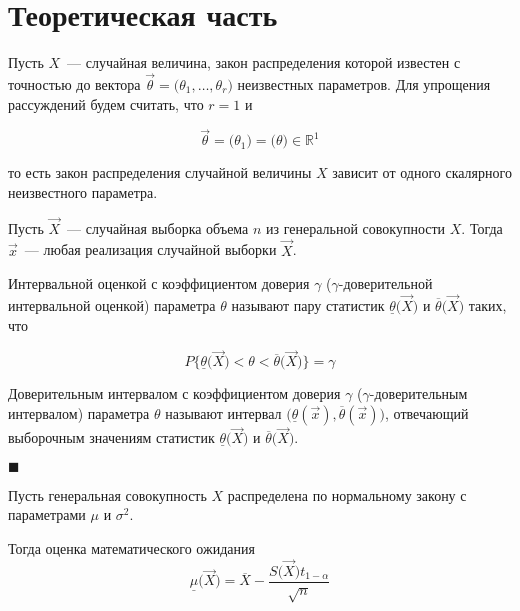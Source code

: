 \chapter{Теоретическая часть}
Пусть $X$~--- случайная величина, закон распределения которой известен с точностью до вектора $\vec \theta = \big( \theta_1, \ldots, \theta_r \big)$ неизвестных параметров. Для упрощения рассуждений будем считать, что $r = 1$ и

\begin{equation*}
    \overrightarrow \theta = \big( \theta_1 \big) = \big( \theta \big) \in \mathbb{R}^1
\end{equation*}

то есть закон распределения случайной величины $X$ зависит от одного скалярного неизвестного параметра.

Пусть $\overrightarrow X$~--- случайная выборка объема $n$ из генеральной совокупности $X$. Тогда $\vec x$~--- любая реализация случайной выборки $\overrightarrow X$.

\sloppy Интервальной оценкой с коэффициентом доверия $\gamma$ ($\gamma$-доверительной интервальной оценкой) параметра $\theta$ называют пару статистик $\underline{\theta} \big( \overrightarrow X \big)$ и $\overline{\theta} \big( \overrightarrow X \big)$ таких, что

\begin{equation*}
    P \bigg\{ \underline{\theta} \big( \overrightarrow X \big) < \theta < \overline{\theta} \big( \overrightarrow X \big) \bigg\} = \gamma
\end{equation*}

\sloppy Доверительным интервалом с коэффициентом доверия $\gamma$ ($\gamma$-доверительным интервалом) параметра $\theta$ называют интервал $\big( \underline{\theta} (\vec x),\overline{\theta} (\vec x) \big)$, отвечающий выборочным значениям статистик $\underline{\theta} \big( \overrightarrow X \big)$ и $\overline{\theta} \big( \overrightarrow X \big)$.

$\blacksquare{}$

Пусть генеральная совокупность $X$ распределена по нормальному закону с параметрами $\mu$ и $\sigma^2$.

Тогда оценка математического ожидания
\begin{equation*}
    \underline{\mu} \big( \overrightarrow X \big) = \overline X - \frac{S\big( \overrightarrow X \big) t_{1 - \alpha}}{\sqrt{n}}
\end{equation*}

